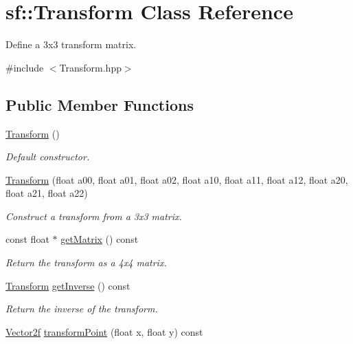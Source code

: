 \hypertarget{classsf_1_1_transform}{}\section{sf\+:\+:Transform Class Reference}
\label{classsf_1_1_transform}


Define a 3x3 transform matrix.  




{\ttfamily \#include $<$Transform.\+hpp$>$}

\subsection*{Public Member Functions}
\begin{DoxyCompactItemize}
\item 
\mbox{\hyperlink{classsf_1_1_transform_ac32de51bd0b9f3d52fbe0838225ee83b}{Transform}} ()
\begin{DoxyCompactList}\small\item\em Default constructor. \end{DoxyCompactList}\item 
\mbox{\hyperlink{classsf_1_1_transform_a78c48677712fcf41122d02f1301d71a3}{Transform}} (float a00, float a01, float a02, float a10, float a11, float a12, float a20, float a21, float a22)
\begin{DoxyCompactList}\small\item\em Construct a transform from a 3x3 matrix. \end{DoxyCompactList}\item 
const float $\ast$ \mbox{\hyperlink{classsf_1_1_transform_ad52616cac686f47bd26bcbdd8e2add40}{get\+Matrix}} () const
\begin{DoxyCompactList}\small\item\em Return the transform as a 4x4 matrix. \end{DoxyCompactList}\item 
\mbox{\hyperlink{classsf_1_1_transform}{Transform}} \mbox{\hyperlink{classsf_1_1_transform_a14f49e81af44aabcff7611f6703a1e4a}{get\+Inverse}} () const
\begin{DoxyCompactList}\small\item\em Return the inverse of the transform. \end{DoxyCompactList}\item 
\mbox{\hyperlink{classsf_1_1_vector2}{Vector2f}} \mbox{\hyperlink{classsf_1_1_transform_af2e38c3c077d28898686662558b41135}{transform\+Point}} (float x, float y) const

\end{DoxyCompactItemize}
